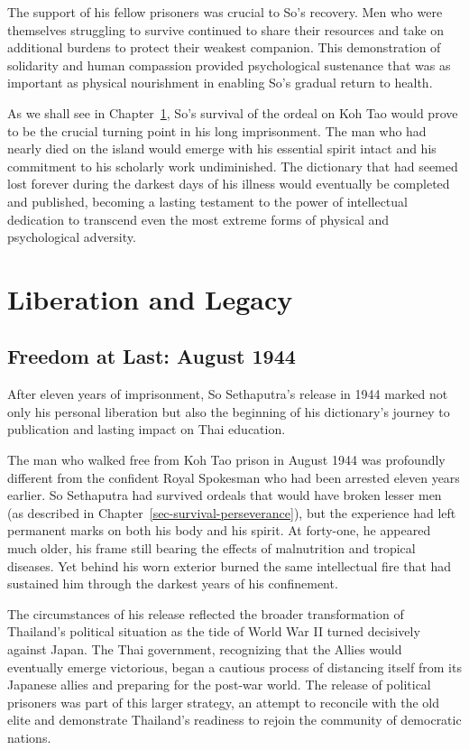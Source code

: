 \documentclass[
  Letterpaper,
]{scrbook}
\begin{document}
The support of his fellow prisoners was crucial to So's recovery. Men
who were themselves struggling to survive continued to share their
resources and take on additional burdens to protect their weakest
companion. This demonstration of solidarity and human compassion
provided psychological sustenance that was as important as physical
nourishment in enabling So's gradual return to health.

As we shall see in Chapter~\ref{sec-liberation-legacy}, So's survival of
the ordeal on Koh Tao would prove to be the crucial turning point in his
long imprisonment. The man who had nearly died on the island would
emerge with his essential spirit intact and his commitment to his
scholarly work undiminished. The dictionary that had seemed lost forever
during the darkest days of his illness would eventually be completed and
published, becoming a lasting testament to the power of intellectual
dedication to transcend even the most extreme forms of physical and
psychological adversity.


\chapter{Liberation and Legacy}\label{sec-liberation-legacy}

\section{Freedom at Last: August
1944}\label{freedom-at-last-august-1944}

After eleven years of imprisonment, So Sethaputra's release in 1944
marked not only his personal liberation but also the beginning of his
dictionary's journey to publication and lasting impact on Thai
education.

The man who walked free from Koh Tao prison in August 1944 was
profoundly different from the confident Royal Spokesman who had been
arrested eleven years earlier. So Sethaputra had survived ordeals that
would have broken lesser men (as described in
Chapter~\ref{sec-survival-perseverance}), but the experience had left
permanent marks on both his body and his spirit. At forty-one, he
appeared much older, his frame still bearing the effects of malnutrition
and tropical diseases. Yet behind his worn exterior burned the same
intellectual fire that had sustained him through the darkest years of
his confinement.

The circumstances of his release reflected the broader transformation of
Thailand's political situation as the tide of World War II turned
decisively against Japan. The Thai government, recognizing that the
Allies would eventually emerge victorious, began a cautious process of
distancing itself from its Japanese allies and preparing for the
post-war world. The release of political prisoners was part of this
larger strategy, an attempt to reconcile with the old elite and
demonstrate Thailand's readiness to rejoin the community of democratic
nations.
\end{document}

